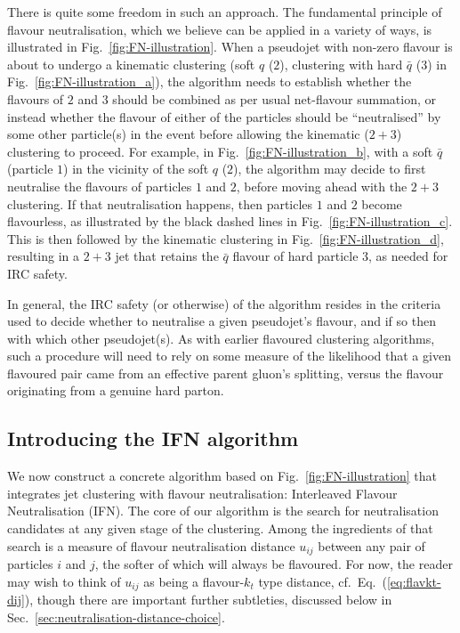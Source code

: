 \documentclass[nofootinbib,twocolumn,preprintnumbers,superscriptaddress,aps]{revtex4-2}
\begin{document}
There is quite some freedom in such an approach.
% 
The fundamental principle of flavour neutralisation, which we believe can be applied in a
variety of ways, is illustrated in Fig.~\ref{fig:FN-illustration}.
%
When a pseudojet with non-zero flavour is about to undergo a kinematic
clustering (soft $q$ ($2$), clustering with hard $\bar q$ ($3$) in
Fig.~\ref{fig:FN-illustration_a}), the algorithm needs to establish
whether the flavours of $2$ and $3$ should be combined as per usual
net-flavour summation, or instead whether the flavour of either of the
particles should be ``neutralised'' by some other particle(s) in the
event before allowing the kinematic ($2+3$) clustering to proceed.
%
For example, in Fig.~\ref{fig:FN-illustration_b}, with a soft $\bar q$
(particle $1$) in the vicinity of the soft $q$ ($2$), the algorithm
may decide to first neutralise the flavours of particles $1$ and $2$,
before moving ahead with the $2+3$ clustering.
%
If that neutralisation happens, then particles $1$ and $2$ become flavourless,
as illustrated by the black dashed lines in Fig.~\ref{fig:FN-illustration_c}.
%
This is then followed by the kinematic clustering in
Fig.~\ref{fig:FN-illustration_d}, resulting in a $2+3$ jet that retains
the $\bar q$ flavour of hard particle $3$, as needed for IRC safety.

In general, the IRC safety (or otherwise) of the algorithm
resides in the criteria used to decide whether to neutralise a given
pseudojet's flavour, and if so then with which other pseudojet(s).
%
As with earlier flavoured clustering algorithms, such a procedure
will need to rely on some measure of the likelihood that a given
flavoured pair came from an effective parent gluon's splitting, versus
the flavour originating from a genuine hard parton.



\subsection{Introducing the IFN algorithm}
\label{sec:IFN-overview}

We now construct a concrete algorithm based on Fig.~\ref{fig:FN-illustration} that integrates jet clustering with flavour neutralisation:  Interleaved Flavour Neutralisation (IFN).
%
The core of our algorithm is the search for neutralisation candidates
at any given stage of the clustering.
%
Among the ingredients of that search is a measure of flavour
neutralisation distance $u_{ij}$ between any pair of particles
$i$ and $j$, the softer of which will always be flavoured.
%
For now, the reader may wish to think of $u_{ij}$ as being a flavour-$k_t$ type
distance, cf.\ Eq.~(\ref{eq:flavkt-dij}), though there are important
further subtleties, discussed below in
Sec.~\ref{sec:neutralisation-distance-choice}.
\end{document}
